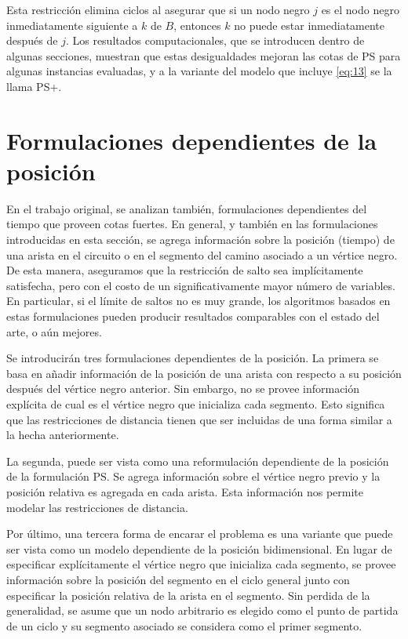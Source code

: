 \documentclass[10pt, a4paper]{article}
\theoremstyle{definition}
\begin{document}
Esta restricción elimina ciclos al asegurar que si un nodo negro $j$ es el nodo negro inmediatamente siguiente a $k$ de $B$, entonces $k$ no puede estar inmediatamente después de $j$. Los resultados computacionales, que se introducen dentro de algunas secciones, muestran que estas desigualdades mejoran las cotas de PS para algunas instancias evaluadas, y a la variante del modelo que incluye \ref{eq:13} se la llama PS+.

\section{Formulaciones dependientes de la posición}

En el trabajo original, se analizan también, formulaciones dependientes del tiempo que proveen cotas fuertes. En general, y también en las formulaciones introducidas en esta sección, se agrega información sobre la posición (tiempo) de una arista en el circuito o en el segmento del camino asociado a un vértice negro.
De esta manera, aseguramos que la restricción de salto sea implícitamente satisfecha, pero con el costo de un significativamente mayor número de variables. En particular, si el límite de saltos no es muy grande, los algoritmos basados en estas formulaciones pueden producir resultados comparables con el estado del arte, o aún mejores.

Se introducirán tres formulaciones dependientes de la posición. La primera se basa en añadir información de la posición de una arista con respecto a su posición después del vértice negro anterior. Sin embargo, no se provee información explícita de cual es el vértice negro que inicializa cada segmento. Esto significa que las restricciones de distancia tienen que ser incluidas de una forma similar a la hecha anteriormente.

La segunda, puede ser vista como una reformulación dependiente de la posición de la formulación PS. Se agrega información sobre el vértice negro previo y la posición relativa es agregada en cada arista. Esta información nos permite modelar las restricciones de distancia.

Por último, una tercera forma de encarar el problema es una variante que puede ser vista como un modelo dependiente de la posición bidimensional. En lugar de especificar explícitamente el vértice negro que inicializa cada segmento, se provee información sobre la posición del segmento en el ciclo general junto con especificar la posición relativa de la arista en el segmento.
Sin perdida de la generalidad, se asume que un nodo arbitrario es elegido como el punto de partida de un ciclo y su segmento asociado se considera como el primer segmento.
\end{document}
